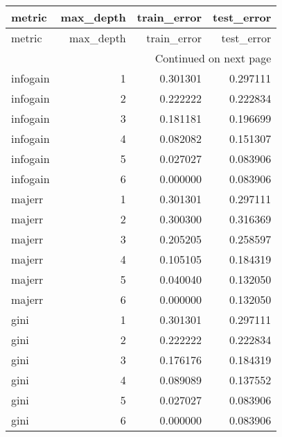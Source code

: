 \begin{longtable}{lrrr}
\toprule
  metric &  max\_depth &  train\_error &  test\_error \\
\midrule
\endfirsthead

\toprule
  metric &  max\_depth &  train\_error &  test\_error \\
\midrule
\endhead
\midrule
\multicolumn{4}{r}{{Continued on next page}} \\
\midrule
\endfoot

\bottomrule
\endlastfoot
infogain &          1 &     0.301301 &    0.297111 \\
infogain &          2 &     0.222222 &    0.222834 \\
infogain &          3 &     0.181181 &    0.196699 \\
infogain &          4 &     0.082082 &    0.151307 \\
infogain &          5 &     0.027027 &    0.083906 \\
infogain &          6 &     0.000000 &    0.083906 \\
  majerr &          1 &     0.301301 &    0.297111 \\
  majerr &          2 &     0.300300 &    0.316369 \\
  majerr &          3 &     0.205205 &    0.258597 \\
  majerr &          4 &     0.105105 &    0.184319 \\
  majerr &          5 &     0.040040 &    0.132050 \\
  majerr &          6 &     0.000000 &    0.132050 \\
    gini &          1 &     0.301301 &    0.297111 \\
    gini &          2 &     0.222222 &    0.222834 \\
    gini &          3 &     0.176176 &    0.184319 \\
    gini &          4 &     0.089089 &    0.137552 \\
    gini &          5 &     0.027027 &    0.083906 \\
    gini &          6 &     0.000000 &    0.083906 \\
\end{longtable}
